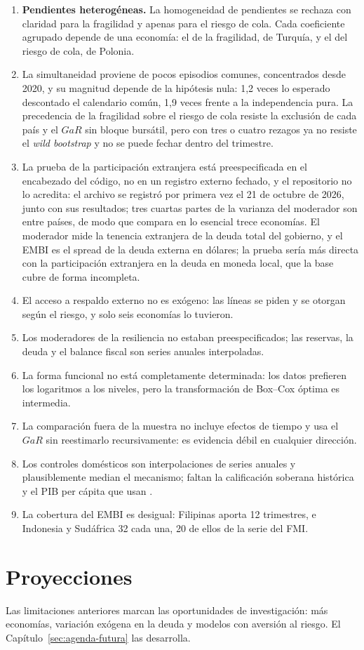 \begin{enumerate}
\item \textbf{Pendientes heterogéneas.} La homogeneidad de pendientes se rechaza con claridad para la fragilidad y apenas para el riesgo de cola. Cada coeficiente agrupado depende de una economía: el de la fragilidad, de Turquía, y el del riesgo de cola, de Polonia.
\item La simultaneidad proviene de pocos episodios comunes, concentrados desde 2020, y su magnitud depende de la hipótesis nula: 1,2 veces lo esperado descontado el calendario común, 1,9 veces frente a la independencia pura. La precedencia de la fragilidad sobre el riesgo de cola resiste la exclusión de cada país y el $GaR$ sin bloque bursátil, pero con tres o cuatro rezagos ya no resiste el \textit{wild bootstrap} y no se puede fechar dentro del trimestre.
\item La prueba de la participación extranjera está preespecificada en el encabezado del código, no en un registro externo fechado, y el repositorio no lo acredita: el archivo se registró por primera vez el 21 de octubre de 2026, junto con sus resultados; tres cuartas partes de la varianza del moderador son entre países, de modo que compara en lo esencial trece economías. El moderador mide la tenencia extranjera de la deuda total del gobierno, y el EMBI es el spread de la deuda externa en dólares; la prueba sería más directa con la participación extranjera en la deuda en moneda local, que la base cubre de forma incompleta.
\item El acceso a respaldo externo no es exógeno: las líneas se piden y se otorgan según el riesgo, y solo seis economías lo tuvieron.
\item Los moderadores de la resiliencia no estaban preespecificados; las reservas, la deuda y el balance fiscal son series anuales interpoladas.
\item La forma funcional no está completamente determinada: los datos prefieren los logaritmos a los niveles, pero la transformación de Box--Cox óptima es intermedia.
\item La comparación fuera de la muestra no incluye efectos de tiempo y usa el $GaR$ sin reestimarlo recursivamente: es evidencia débil en cualquier dirección.
\item Los controles domésticos son interpolaciones de series anuales y plausiblemente median el mecanismo; faltan la calificación soberana histórica y el PIB per cápita que usan \citet{Chari2024b}.
\item La cobertura del EMBI es desigual: Filipinas aporta 12 trimestres, e Indonesia y Sudáfrica 32 cada una, 20 de ellos de la serie del FMI.
\end{enumerate}

\section{Proyecciones}
\label{sec:disc-proyecciones}

Las limitaciones anteriores marcan las oportunidades de investigación: más economías, variación exógena en la deuda y modelos con aversión al riesgo. El Capítulo~\ref{sec:agenda-futura} las desarrolla.

